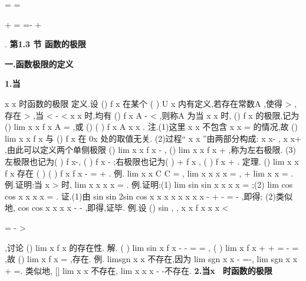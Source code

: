 =
=
\Rightarrow 
\Rightarrow 


+
=
=-
+


. 
\vspace{6pt}
{\large \bfseries \textcolor{lyred}{第1.3 节 函数的极限}}

\vspace{4pt}
{\bfseries \textcolor{lyred}{一.函数极限的定义}}

{\bfseries \textcolor{lyred}{1.当}}

\textcolor{lyred}{x}
\textcolor{lyred}{x}
\textcolor{lyred}{\to }
\textcolor{lyred}{时函数的极限 }
\textcolor{lyred}{定义}.设
()
f x 在某个
(
)
U x
\circ 
内有定义,若存在常数A ,使得
\varepsilon 
\forall >
,存在
\delta >
,当 
\delta 
<
-
<
x
x
时,均有
()
f x
A
\varepsilon 
-
<
,则称A 为当
x
x
\to 
时,
()
f x 的\textcolor{lyred}{极限},记为 
()
lim
x
x f x
A
\to 
=
,或
()
(
)
f x
A x
x
\to 
\to 
. 
\textcolor{lyred}{注}.(1)这里
x
x
\to 
不包含
x
x
=
的情况,故
()
lim
x
x f x
\to 
与
()
f x 在
0x 处的取值无关. 
(2)过程“
x
x
\to 
”由两部分构成:
x
x-
\to 
,
x
x+
\to 
,由此可以定义两个\textcolor{lyred}{单侧极限 }
()
lim
x
x f x
-
\to 
,
()
lim
x
x f x
+
\to 
,称为\textcolor{lyred}{左右极限}. 
(3)左极限也记为(
)
f x-,
(
)
f x -
;右极限也记为(
)
+
f x
,
(
)
f x +
. 
\textcolor{lyred}{定理}.
()
lim
x
x f x
\to 
存在
(
)
(
)
f x
f x
\Leftrightarrow 
-
=
+
. 
\textcolor{lyred}{例}.
lim
x
x C
C
\to 
=
,
lim
x
x x
x
\to 
=
,
+
lim
x
x
\to 
=
. 
\textcolor{lyred}{例}.证明:当
x >
时,
lim
x
x
x
x
\to 
=
. 
\textcolor{lyred}{例}.证明:(1)
lim sin
sin
x
x
x
x
\to 
=
;(2)
lim cos
cos
x
x
x
x
\to 
=
. 
证.(1)由
sin
sin
2sin
cos
x
x
x
x
x
x
x
x
-
+
-
=
\le 
-
,即得; 
(2)类似地,
cos
cos
x
x
x
x
-
\le 
-
,即得,证毕. 
\textcolor{lyred}{例}.设
()
sin ,
,
x
x
f x
x
x
\pi 
\pi 
\pi 
<

=
-
>

,讨论
()
lim
x
f x
\pi 
\to 
的存在性. 
解. (
)
lim sin
x
f
x
\pi 
\pi 
-
-
\to 
=
=
, (
)
lim
x
f
x
\pi 
\pi 
\pi 
+
+
\to 
=
-
=
,故
()
lim
x
f x
\pi 
\to 
=
,存在. 
\textcolor{lyred}{例}.
limsgn
x
x
\to 
不存在,因为
lim sgn
x
x
-
\to 
=-,
lim sgn
x
x
+
\to 
=.\textcolor{lyred}{ }
类似地,
[]
lim
x
x
\to 
不存在,
lim
x
x
x
\to 
-
-不存在. 
{\bfseries \textcolor{lyred}{2.当x 时函数的极限}}

